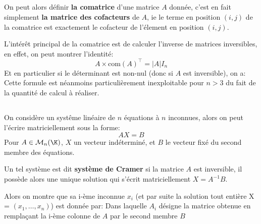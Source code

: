\subsection*{}

On peut alors définir \textbf{la comatrice} d'une matrice \(A\) donnée, c'est en fait simplement \textbf{la matrice des cofacteurs} de \(A\), ie le terme en position \((i, j)\) de la comatrice est exactement le cofacteur de l'élement en position \((i, j)\). \<

L'intérêt principal de la comatrice est de calculer l'inverse de matrices inversibles, en effet, on peut montrer l'identité:
\[
   A \times \text{com}(A)^{\top} = |A|I_n   
\]
Et en particulier si le déterminant est non-nul (donc si \(A\) est inversible), on a:
Cette formule est néanmoins particulièrement inexploitable pour \(n > 3\) du fait de la quantité de calcul à réaliser.

\subsection*{}

On considère un systême linéaire de \(n\) équations à \(n\) inconnues, alors on peut l'écrire matriciellement sous la forme:
\[
   AX = B   
\]
Pour \(A \in \mathcal{M}_n(\K)\), \(X\) un vecteur indéterminé, et \(B\) le vecteur fixé du second membre des équations.
\pagebreak

Un tel système est dit \textbf{système de Cramer} si la matrice \(A\) est inversible, il possède alors une unique solution qui s'écrit matriciellement \(X = A^{-1}B\). \<

Alors on montre que sa i-ème inconnue \(x_i\) (et par suite la solution tout entière X = \((x_1, \ldots, x_n)\)) est donnée par:
Dans laquelle \(A_i\) désigne la matrice obtenue en remplaçant la i-ème colonne de \(A\) par le second membre \(B\)\<

